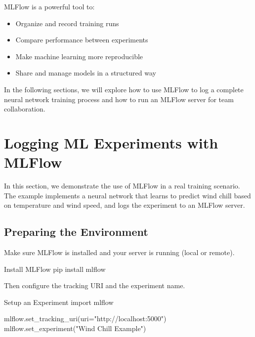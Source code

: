 MLFlow is a powerful tool to:

\begin{itemize}
    \item Organize and record training runs
    \item Compare performance between experiments
    \item Make machine learning more reproducible
    \item Share and manage models in a structured way
\end{itemize}

In the following sections, we will explore how to use MLFlow to log a complete neural network training process and how to run an MLFlow server for team collaboration.

%
\section{Logging ML Experiments with MLFlow}

In this section, we demonstrate the use of MLFlow in a real training scenario. The example implements a neural network that learns to predict wind chill based on temperature and wind speed, and logs the experiment to an MLFlow server.

%
\subsection{Preparing the Environment}

Make sure MLFlow is installed and your server is running (local or remote).

\begin{codeonly}{Install MLFlow}
pip install mlflow
\end{codeonly}

Then configure the tracking URI and the experiment name.

\begin{codeonly}{Setup an Experiment}
import mlflow

mlflow.set_tracking_uri(uri="http://localhost:5000")
mlflow.set_experiment("Wind Chill Example")
\end{codeonly}

